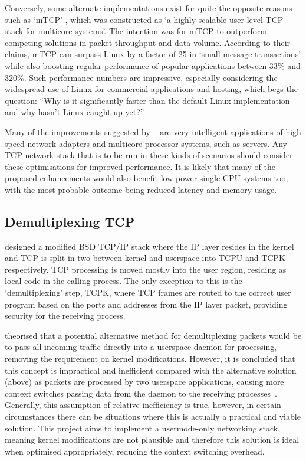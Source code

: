 \documentclass[11pt,a4paper,british]{bhamarticle}
\begin{document}
\begin{multicols}{2}
Conversely, some alternate implementations exist for quite the opposite reasons such as `mTCP' \citeauthor{jeong2014mtcp}, which was constructed as `a highly scalable user-level TCP stack for multicore systems'. The intention was for mTCP to outperform competing solutions in packet throughput and data volume. According to their claims, mTCP can surpass Linux by a factor of 25 in `small message transactions' while also boosting regular performance of popular applications between 33\% and 320\%. Such performance numbers are impressive, especially considering the widespread use of Linux for commercial applications and hosting, which begs the question: ``Why is it significantly faster than the default Linux implementation and why hasn't Linux caught up yet?''~\cite[2.2, 3]{jeong2014mtcp}

Many of the improvements suggested by \citeauthor{jeong2014mtcp}~\cite{jeong2014mtcp} are very intelligent applications of high speed network adapters and multicore processor systems, such as servers. Any TCP network stack that is to be run in these kinds of scenarios should consider these optimisations for improved performance. It is likely that many of the proposed enhancements would also benefit low-power single CPU systems too, with the most probable outcome being reduced latency and memory usage.

\subsection{Demultiplexing TCP}\label{sec:demultiplex}
\citeauthor{braun:inria-00074040} designed a modified BSD TCP/IP stack where the IP layer resides in the kernel and TCP is split in two between kernel and userspace into TCPU and TCPK respectively. TCP processing is moved mostly into the user region, residing as local code in the calling process. The only exception to this is the `demultiplexing' step, TCPK, where TCP frames are routed to the correct user program based on the ports and addresses from the IP layer packet, providing security for the receiving process.

\citeauthor{braun:inria-00074040} theorised that a potential alternative method for demultiplexing packets would be to pass all incoming traffic directly into a userspace daemon for processing, removing the requirement on kernel modifications. However, it is concluded that this concept is impractical and inefficient compared with the alternative solution (above) as packets are processed by two userspace applications, causing more context switches passing data from the daemon to the receiving processes~\cite[2.1]{braun:inria-00074040}\cite[3]{edwards1995experiences}. Generally, this assumption of relative inefficiency is true, however, in certain circumstances there can be situations where this is actually a practical and viable solution. This project aims to implement a usermode-only networking stack, meaning kernel modifications are not plausible and therefore this solution is ideal when optimised appropriately, reducing the context switching overhead.


\end{multicols}
\end{document}
